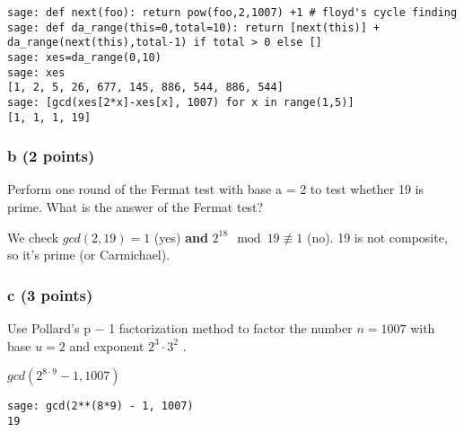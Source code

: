 \documentclass{article}
\begin{document}
\begin{verbatim}
sage: def next(foo): return pow(foo,2,1007) +1 # floyd's cycle finding
sage: def da_range(this=0,total=10): return [next(this)] + da_range(next(this),total-1) if total > 0 else []
sage: xes=da_range(0,10)
sage: xes
[1, 2, 5, 26, 677, 145, 886, 544, 886, 544]
sage: [gcd(xes[2*x]-xes[x], 1007) for x in range(1,5)]
[1, 1, 1, 19]
\end{verbatim}

\subsubsection{b (2 points)}
Perform one round of the Fermat test with base
a = 2 to test whether 19 is prime.
What is the answer of the Fermat test?

We check $gcd(2,19) = 1$ (yes) \textbf{and} $2^{18} \mod 19 \not \equiv 1$ (no).
19 is not composite, so it's prime (or Carmichael).

\subsubsection{c (3 points)}
Use Pollard’s p − 1 factorization method to factor the number
$n = 1007$ with base $u = 2$ and exponent $2^3 \cdot 3^2$ .

$gcd(2^{8 \cdot 9} -1, 1007)$ \\
\begin{verbatim}
sage: gcd(2**(8*9) - 1, 1007)
19
\end{verbatim}
\end{document}
